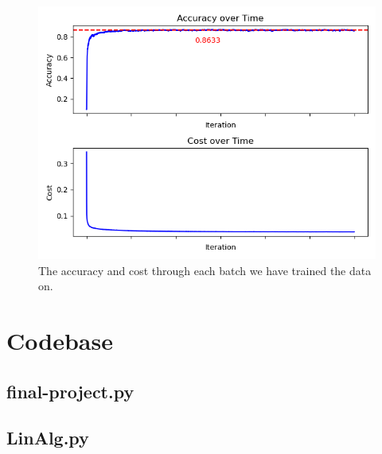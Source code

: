\documentclass[a4paper,oneside,article,english]{memoir}
\begin{document}
\begin{figure}[H]
  \centering
  \includegraphics[scale = 0.7]{cost_accuracy_with_line.png}
  \caption{The accuracy and cost through each batch we have trained the data on.}
  \label{fig:cost-accuracy}
\end{figure}

\section{Codebase}  
\label{sec:codebase}

\subsection{final-project.py}
\label{sub:final_project_py}



\subsection{LinAlg.py}
\label{sub:linAlg_py}


\end{document}
